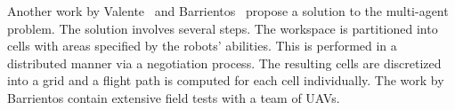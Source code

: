 \documentclass[../main.tex]{subfiles}
\begin{document}
Another work by Valente~\cite{valente2011multi} and Barrientos~\cite{barrientos2011aerial} propose a solution to the multi-agent problem. The solution involves several steps. The workspace is partitioned into cells with areas specified by the robots' abilities. This is performed in a distributed manner via a negotiation process. The resulting cells are discretized into a grid and a flight path is computed for each cell individually. The work by Barrientos contain extensive field tests with a team of UAVs.



\end{document}
